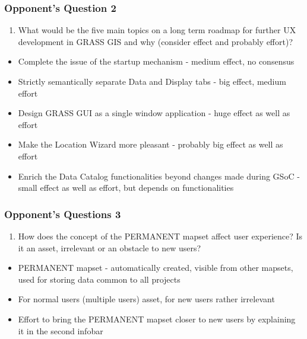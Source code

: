 \documentclass[aspectratio=169]{beamer}
\begin{document}
\begin{frame}
\frametitle{Opponent's Question 2}
\begin{enumerate}\addtocounter{enumi}{1}
\item{What would be the five main topics on a long term roadmap for further UX development in GRASS GIS and why (consider effect and probably effort)?}
\end{enumerate}
\begin{itemize}
\vspace{0.3cm}
\item{Complete the issue of the startup mechanism} - medium effect, no consensus
\item{Strictly semantically separate Data and Display tabs} - big effect, medium effort
\item{Design GRASS GUI as a single window application} - huge effect as well as effort
\item{Make the Location Wizard more pleasant} - probably big effect as well as effort
\item{Enrich the Data Catalog functionalities beyond changes made during GSoC} - small effect as well as effort, but depends on functionalities
\end{itemize}
\end{frame}

\begin{frame}
\frametitle{Opponent's Questions 3}
\begin{enumerate}\addtocounter{enumi}{2}
\item{How does the concept of the PERMANENT mapset affect user experience? Is it an asset, irrelevant or an obstacle to new users?}
\end{enumerate}
\begin{itemize}
\vspace{0.3cm}
\item{PERMANENT mapset - automatically created, visible from other mapsets, used for storing data common to all projects}
\item{For normal users (multiple users) asset, for new users rather irrelevant}
\item{Effort to bring the PERMANENT mapset closer to new users by explaining it in the second infobar}
\end{itemize}
\end{frame}
\end{document}
